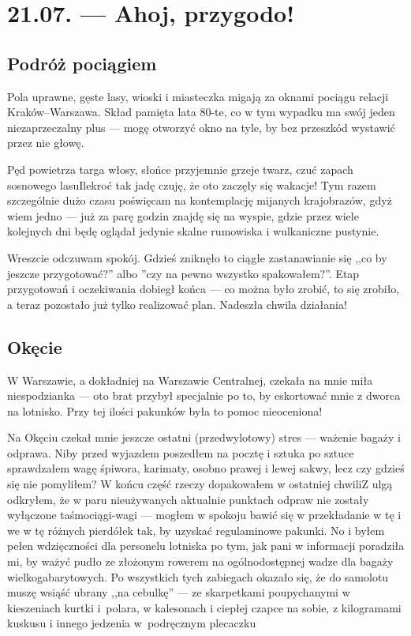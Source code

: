 \chapter*{21.07. --- Ahoj, przygodo!}

\section*{Podróż pociągiem}

Pola uprawne, gęste lasy, wioski i miasteczka migają za oknami pociągu relacji Kraków--Warszawa. Skład pamięta lata 80-te, co w tym wypadku ma swój jeden niezaprzeczalny plus --- mogę otworzyć okno na tyle, by bez przeszkód wystawić przez nie głowę.

Pęd powietrza targa włosy, słońce przyjemnie grzeje twarz, czuć zapach sosnowego lasu\textellipsis Ilekroć tak jadę czuję, że oto zaczęły się wakacje! Tym razem szczególnie dużo czasu poświęcam na kontemplację mijanych krajobrazów, gdyż wiem jedno --- już za parę godzin znajdę się na wyspie, gdzie przez wiele kolejnych dni będę oglądał jedynie skalne rumowiska i wulkaniczne pustynie.

Wreszcie odczuwam spokój. Gdzieś zniknęło to ciągłe zastanawianie się ,,co by jeszcze przygotować?'' albo ''czy na pewno wszystko spakowałem?''. Etap przygotowań i oczekiwania dobiegł końca --- co można było zrobić, to się zrobiło, a teraz pozostało już tylko realizować plan. Nadeszła chwila działania!

\section*{Okęcie}

W Warszawie, a dokładniej na Warszawie Centralnej, czekała na mnie miła niespodzianka --- oto brat przybył specjalnie po to, by eskortować mnie z dworca na lotnisko. Przy tej ilości pakunków była to pomoc nieoceniona!

Na Okęciu czekał mnie jeszcze ostatni (przedwylotowy) stres --- ważenie bagaży i odprawa. Niby przed wyjazdem poszedłem na pocztę i sztuka po sztuce sprawdzałem wagę śpiwora, karimaty, osobno prawej i lewej sakwy, lecz czy gdzieś się nie pomyliłem? W końcu część rzeczy dopakowałem w ostatniej chwili\textellipsis Z ulgą odkryłem, że w paru nieużywanych aktualnie punktach odpraw nie zostały wyłączone taśmociągi-wagi --- mogłem w spokoju bawić się w przekładanie w tę i we w tę różnych pierdółek tak, by uzyskać regulaminowe pakunki. No i byłem pełen wdzięczności dla personelu lotniska po tym, jak pani w informacji poradziła mi, by ważyć pudło ze złożonym rowerem na ogólnodostępnej wadze dla bagaży wielkogabarytowych. Po wszystkich tych zabiegach okazało się, że do samolotu muszę wsiąść ubrany ,,na cebulkę'' --- ze skarpetkami poupychanymi w kieszeniach kurtki i~polara, w kalesonach i ciepłej czapce na sobie, z kilogramami kuskusu i innego jedzenia w~podręcznym plecaczku\textellipsis

